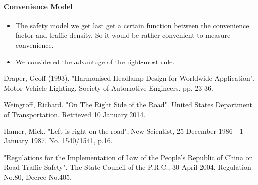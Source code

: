 \paragraph{Convenience Model}
\begin{itemize}
\item The safety model we get last get a certain function between the convenience factor and traffic density. So it would be rather convenient to measure convenience.
\item We considered the advantage of the right-most rule. 
\end{itemize}

\begin{thebibliography}{99}

 Draper, Geoff (1993). "Harmonised 
Headlamp Design for Worldwide Application". Motor Vehicle 
Lighting. Society of Automotive Engineers. pp. 23-36.

 Weingroff, Richard. "On The 
Right Side of the Road". United States Department of 
Transportation. Retrieved 10 January 2014.

 Hamer, Mick. "Left is right on the 
road", New Scientist, 25 December 1986 - 1 January 1987. No.
1540/1541, p.16.

 "Regulations for the Implementation of Law of the People's Republic of China on 
Road Traffic Safety". The State Council of the P.R.C., 30 
April 2004. Regulation No.80, Decree No.405.

\end{thebibliography}
